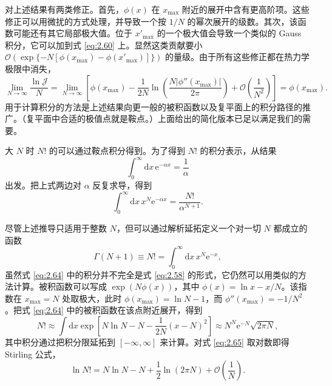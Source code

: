
对上述结果有两类修正。首先，$\phi(x)$ 在 $x_{\max}$ 附近的展开中含有更高阶项。这些修正可以用微扰的方式处理，并导致一个按 $1/N$ 的幂次展开的级数。其次，该函数可能还有其它局部极大值。位于 $x'_{\max}$ 的一个极大值会导致一个类似的 Gauss 积分，它可以加到式 \eqref{eq:2.60} 上。显然这类贡献要小 $\mathcal{O}(\exp\{-N[\phi(x_{\max})-\phi(x'_{\max})]\})$ 的量级。由于所有这些修正都在热力学极限中消失，
\begin{equation}\label{eq:2.61}
  \lim_{N\to\infty}\frac{\ln\mathscr{J}}{N}=\lim_{N\to\infty}\left[\phi(x_{\max})-\frac{1}{2N}\ln\left(\frac{N\left|\phi''(x_{\max})\right|}{2\pi}\right)+\mathcal{O}\left(\frac{1}{N^2}\right)\right]=\phi(x_{\max}).
\end{equation}
用于计算积分的方法是上述结果向更一般的被积函数以及复平面上的积分路径的推广。（复平面中合适的极值点就是鞍点。）上面给出的简化版本已足以满足我们的需要。

大 $N$ 时 $N!$ 的可以通过鞍点积分得到。为了得到 $N!$ 的积分表示，从结果
\begin{equation}\label{eq:2.62}
  \int_0^{\infty}\mathrm{d}x\,\mathrm{e}^{-\alpha x}=\frac{1}{\alpha}
\end{equation}
出发。把上式两边对 $\alpha$ 反复求导，得到
\begin{equation}\label{eq:2.63}
  \int_0^{\infty}\mathrm{d}x\,x^N\mathrm{e}^{-\alpha x}=\frac{N!}{\alpha^{N+1}}.
\end{equation}

尽管上述推导只适用于整数 $N$，但可以通过解析延拓定义一个对一切 $N$ 都成立的函数
\begin{equation}\label{eq:2.64}
  \Gamma(N+1)\equiv N!=\int_0^{\infty}\mathrm{d}x\,x^N\mathrm{e}^{-x},
\end{equation}
虽然式 \eqref{eq:2.64} 中的积分并不完全是式 \eqref{eq:2.58} 的形式，它仍然可以用类似的方法计算。被积函数可以写成 $\exp(N\phi(x))$，其中 $\phi(x)=\ln x-x/N$。该指数在 $x_{\max}=N$ 处取极大，此时 $\phi(x_{\max})=\ln N-1$，而 $\phi''(x_{\max})=-1/N^2$。把式 \eqref{eq:2.64} 中的被积函数在该点附近展开，得到
\begin{equation}\label{eq:2.65}
  N!\approx\int\mathrm{d}x\exp\left[N\ln N-N-\frac{1}{2N}(x-N)^2\right]\approx N^N\mathrm{e}^{-N}\sqrt{2\pi N},
\end{equation}
其中积分通过把积分限延拓到 $[-\infty,\infty]$ 来计算。对式 \eqref{eq:2.65} 取对数即得 Stirling 公式，
\begin{equation}\label{eq:2.66}
  \ln N!=N\ln N-N+\frac{1}{2}\ln(2\pi N)+\mathcal{O}\left(\frac{1}{N}\right).
\end{equation}

